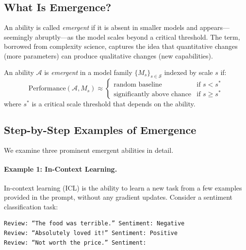 \subsection{What Is Emergence?}

An ability is called \emph{emergent} if it is absent in smaller models and appears---seemingly abruptly---as the model scales beyond a critical threshold. The term, borrowed from complexity science, captures the idea that quantitative changes (more parameters) can produce qualitative changes (new capabilities).

\begin{dogmadef}
\label{def:emergent}
An ability $\mathcal{A}$ is \emph{emergent} in a model family $\{M_s\}_{s \in \mathcal{S}}$ indexed by scale $s$ if:
\begin{equation}
\text{Performance}(\mathcal{A}, M_s) \approx
\begin{cases}
\text{random baseline} & \text{if } s < s^* \\
\text{significantly above chance} & \text{if } s \geq s^*
\end{cases}
\end{equation}
where $s^*$ is a critical scale threshold that depends on the ability.
\end{dogmadef}

\subsection{Step-by-Step Examples of Emergence}

We examine three prominent emergent abilities in detail.

\paragraph{Example 1: In-Context Learning.}
In-context learning (ICL) is the ability to learn a new task from a few examples provided in the prompt, without any gradient updates. Consider a sentiment classification task:

\begin{center}
\begin{minipage}{0.85\textwidth}
\texttt{Review: ``The food was terrible.'' Sentiment: Negative}\\
\texttt{Review: ``Absolutely loved it!'' Sentiment: Positive}\\
\texttt{Review: ``Not worth the price.'' Sentiment: }
\end{minipage}
\end{center}

